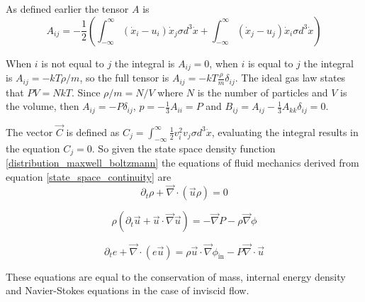 \documentclass[%
 reprint,
 amsmath,amssymb,
 aps,
]{revtex4-1}
\newcommand{\grad}{\vec{\nabla}}
\newcommand{\intVdot}[1]{\int_{-\infty}^{\infty} #1 d^3\dot{x}}
\begin{document}
As defined earlier the tensor $A$ is
\[
A_{ij} = -\frac{1}{2}\left(\intVdot{\left(\dot{x}_i - u_i\right)\dot{x}_j\sigma} + \intVdot{\left(\dot{x}_j - u_j\right)\dot{x}_i\sigma}\right)
\]

When $i$ is not equal to $j$ the integral is $A_{ij} = 0$, when $i$ is equal to $j$ the integral is $A_{ij} = -kT\rho/m$, so the full tensor is $A_{ij}=-kT\frac{\rho}{m}\delta_{ij}$. The ideal gas law states that $PV=NkT$. Since $\rho/m=N/V$ where $N$ is the number of particles and $V$ is the volume, then $A_{ij} = -P\delta_{ij}$, $p=-\frac{1}{3}A_{ii}=P$ and $B_{ij}=A_{ij}-\frac{1}{3}A_{kk}\delta_{ij} = 0$.

The vector $\vec{C}$ is defined as $C_j = \intVdot{\frac{1}{2}v_i^2 v_j\sigma}$, evaluating the integral results in the equation $C_j = 0$. So given the state space density function \eqref{distribution_maxwell_boltzmann} the equations of fluid mechanics derived from equation \eqref{state_space_continuity} are
\[
\partial_t\rho + \grad\cdot\left(\vec{u}\rho\right)=0
\]

\[
\rho\left(\partial_t \vec{u} + \vec{u}\cdot\grad\vec{u}\right) = - \grad P - \rho\grad\phi
\]

\[
\partial_te + \grad\cdot\left(e \vec{u}\right) = \rho\vec{u}\cdot\grad\phi_{\text{in}} - P\grad\cdot\vec{u}
\]

These equations are equal to the conservation of mass, internal energy density and Navier-Stokes equations in the case of inviscid flow.
\end{document}
